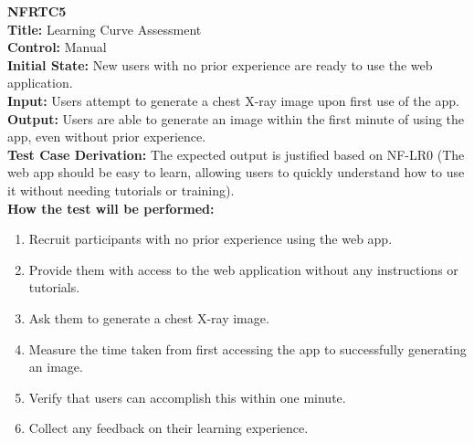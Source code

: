 \documentclass[12pt, titlepage]{article}
\begin{document}
\textbf{NFRTC5}\\
\textbf{Title:} Learning Curve Assessment\\
\textbf{Control:} Manual\\
\textbf{Initial State:} New users with no prior experience are ready to use the web application.\\
\textbf{Input:} Users attempt to generate a chest X-ray image upon first use of the app.\\
\textbf{Output:} Users are able to generate an image within the first minute of using the app, even without prior experience.\\
\textbf{Test Case Derivation:} The expected output is justified based on NF-LR0 (The web app should be easy to learn, allowing users to quickly understand how to use it without needing tutorials or training).\\
\textbf{How the test will be performed:}
\begin{enumerate}
  \item Recruit participants with no prior experience using the web app.
  \item Provide them with access to the web application without any instructions or tutorials.
  \item Ask them to generate a chest X-ray image.
  \item Measure the time taken from first accessing the app to successfully generating an image.
  \item Verify that users can accomplish this within one minute.
  \item Collect any feedback on their learning experience.
\end{enumerate}
\vspace{1em}
\end{document}
